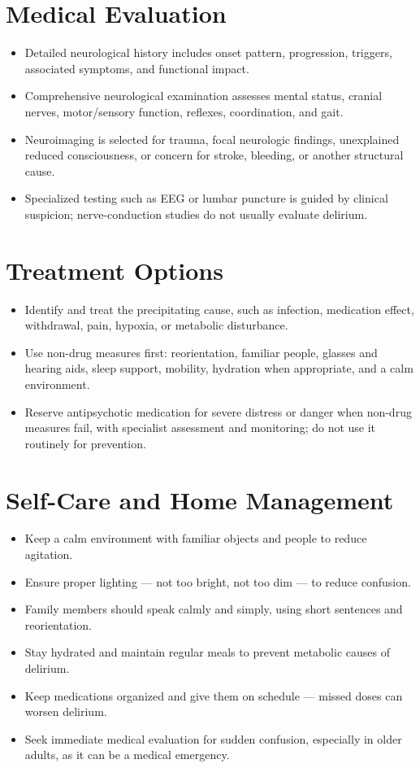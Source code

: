 \section*{Medical Evaluation}
\begin{itemize}
  \item Detailed neurological history includes onset pattern, progression, triggers, associated symptoms, and functional impact.
  \item Comprehensive neurological examination assesses mental status, cranial nerves, motor/sensory function, reflexes, coordination, and gait.
  \item Neuroimaging is selected for trauma, focal neurologic findings, unexplained reduced consciousness, or concern for stroke, bleeding, or another structural cause.
  \item Specialized testing such as EEG or lumbar puncture is guided by clinical suspicion; nerve-conduction studies do not usually evaluate delirium.
\end{itemize}

\section*{Treatment Options}
\begin{itemize}
  \item Identify and treat the precipitating cause, such as infection, medication effect, withdrawal, pain, hypoxia, or metabolic disturbance.
  \item Use non-drug measures first: reorientation, familiar people, glasses and hearing aids, sleep support, mobility, hydration when appropriate, and a calm environment.
  \item Reserve antipsychotic medication for severe distress or danger when non-drug measures fail, with specialist assessment and monitoring; do not use it routinely for prevention.
\end{itemize}

\section*{Self-Care and Home Management}
\begin{itemize}
  \item Keep a calm environment with familiar objects and people to reduce agitation.
  \item Ensure proper lighting — not too bright, not too dim — to reduce confusion.
  \item Family members should speak calmly and simply, using short sentences and reorientation.
  \item Stay hydrated and maintain regular meals to prevent metabolic causes of delirium.
  \item Keep medications organized and give them on schedule — missed doses can worsen delirium.
  \item Seek immediate medical evaluation for sudden confusion, especially in older adults, as it can be a medical emergency.
\end{itemize}

